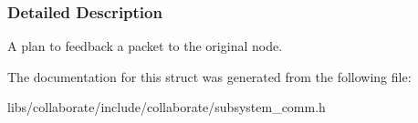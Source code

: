\subsubsection{Detailed Description}
A plan to feedback a packet to the original node. 

The documentation for this struct was generated from the following file\+:\begin{DoxyCompactItemize}
\item 
libs/collaborate/include/collaborate/subsystem\+\_\+comm.\+h\end{DoxyCompactItemize}
